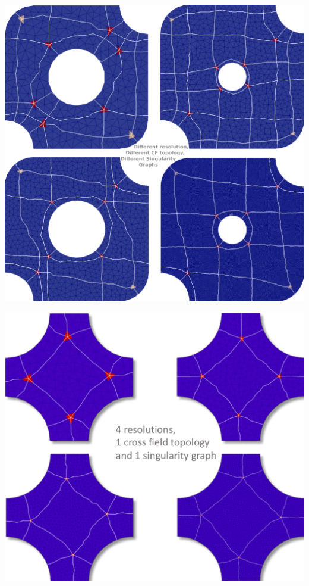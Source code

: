 \documentclass[a0paper,portrait, fontscale=0.30]{baposter}
\begin{document}
\begin{poster}
{\begin{minipage}[b]{0.35\linewidth}
\end{minipage}
\vspace{0.41cm}
\begin{minipage}[b]{0.48\linewidth}
  \includegraphics[width=\textwidth]{diff_res_diff_CFTop_diff_singGraph}
\end{minipage}
\begin{minipage}[b]{0.48\linewidth}
  \includegraphics[width=\textwidth]{P_collection}

\end{minipage}}
\end{poster}
\end{document}

